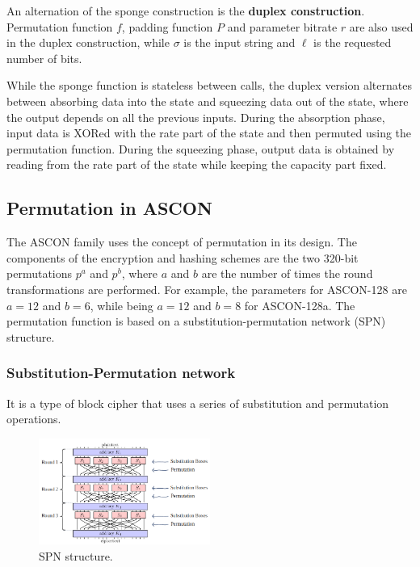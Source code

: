 \documentclass{article}
\begin{document}
An alternation of the sponge construction is the \textbf{duplex construction}. Permutation function $f$, padding function $P$ and parameter bitrate $r$ are also used in the duplex construction, while $\sigma$ is the input string and $\ell$ is the requested number of bits. \cite{keccak_team,sponge_function_2023,guido_b_d_michaël_p_2011} \par 

While the sponge function is stateless between calls, the duplex version alternates between absorbing data into the state and squeezing data out of the state, where the output depends on all the previous inputs. \cite{guido_b_d_michaël_p_2011,cryptoeprint:2023/796} During the absorption phase, input data is XORed with the rate part of the state and then permuted using the permutation function. During the squeezing phase, output data is obtained by reading from the rate part of the state while keeping the capacity part fixed. \par

\subsection{Permutation in ASCON}
The ASCON family uses the concept of permutation in its design. The components of the encryption and hashing schemes are the two 320-bit permutations $p^a$ and $p^b$, where $a$ and $b$ are the number of times the round transformations are performed. For example, the parameters for ASCON-128 are $a = 12$ and $b = 6$, while being $a = 12$ and $b = 8$ for ASCON-128a. The permutation function is based on a substitution-permutation network (SPN) structure. \cite{DBLP:journals/joc/DobraunigEMS21, ascon_specification} \par

\subsubsection{Substitution-Permutation network}

It is a type of block cipher that uses a series of substitution and permutation operations.

\begin{figure}[htbp]
  \centering
  \includegraphics[width=0.5\textwidth]{images/spn.png}
  \caption{SPN structure.}
  \label{fig:spn}
\end{figure}
\end{document}
